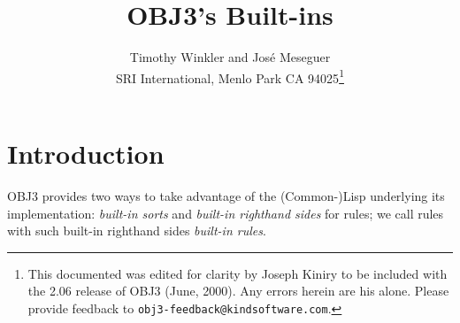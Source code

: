 
\setlength{\headsep}{-.4in}
\setlength{\textwidth}{6.5in}
\setlength{\textheight}{9in}
\setlength{\oddsidemargin}{0in}

\newcommand{\warn}{\noindent {\bf Warning:} \hspace{1ex}}
\newcommand{\bobj}{\begin{quote}\begin{alltt}}
\newcommand{\eobj}{\end{alltt}\end{quote}}
\newcommand{\more}{\vspace{.1in}{\begin{center} ||| MORE TO COME HERE |||
  \end{center}}\vspace{.1in}}

\newcommand{\nt}[1]{\mbox{$\langle\!\!\!$ {\it {#1}} $\!\!\rangle$}}
\newcommand{\alt}{$\mid$}
\newcommand{\lopt}{$[$}
\newcommand{\ropt}{$]$}
\newcommand{\lsg}{\{}
\newcommand{\rsg}{\}}
\newcommand{\itr}{$\ldots$}
\newcommand{\itd}{$\ldots$}

\def\newblock{}


\newcommand{\ra}{$\rightarrow$}
\newcommand{\noi}{\noindent}



\title{\vspace{-.75in}OBJ3's Built-ins}

\author{Timothy Winkler and Jos\'e Meseguer \\
  SRI International, Menlo Park CA 94025\footnote{This documented was
  edited for clarity by Joseph Kiniry to be included with the 2.06
  release of OBJ3 (June, 2000).  Any errors herein are his alone.
  Please provide feedback to {\tt obj3-feedback@kindsoftware.com}.}}

\maketitle

\section{Introduction}

OBJ3 provides two ways to take advantage of the (Common-)Lisp underlying
its implementation: {\em built-in sorts} and {\em built-in righthand
sides} for rules; we call rules with such built-in righthand sides
{\em built-in rules}.

